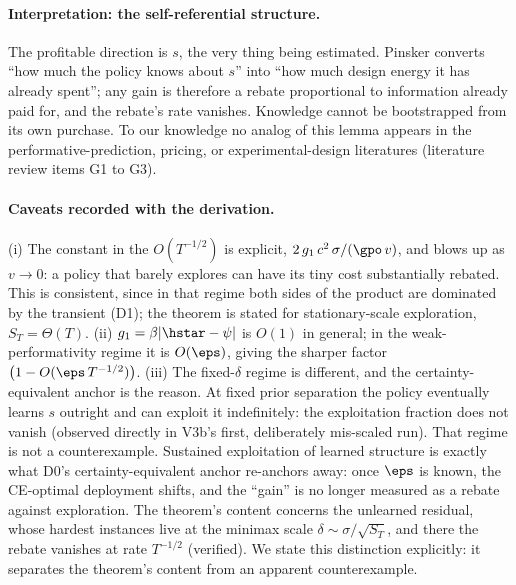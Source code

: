 \paragraph{Interpretation: the self-referential structure.}
The profitable direction is $s$, the very thing being estimated. Pinsker
converts ``how much the policy knows about $s$'' into ``how much design
energy it has already spent''; any gain is therefore a rebate proportional
to information already paid for, and the rebate's rate vanishes. Knowledge
cannot be bootstrapped from its own purchase. To our knowledge no analog of
this lemma appears in the performative-prediction, pricing, or
experimental-design literatures (literature review items G1 to G3).

\paragraph{Caveats recorded with the derivation.}
(i) The constant in the $O(T^{-1/2})$ is explicit,
$2\,g_1\,c^2\,\sigma/(\gpo\, v)$, and blows up as $v\to 0$: a policy that
barely explores can have its tiny cost substantially rebated. This is
consistent, since in that regime both sides of the product are dominated by
the transient (D1); the theorem is stated for stationary-scale exploration,
$S_T=\Theta(T)$.
(ii) $g_1=\beta|\hstar-\psi|$ is $O(1)$ in general; in the
weak-performativity regime it is $O(\eps)$, giving the sharper factor
$\big(1-O(\eps\, T^{-1/2})\big)$.
(iii) The fixed-$\delta$ regime is different, and the certainty-equivalent
anchor is the reason. At fixed prior separation the policy eventually learns
$s$ outright and can exploit it indefinitely: the exploitation fraction does
not vanish (observed directly in V3b's first, deliberately mis-scaled run).
That regime is not a counterexample. Sustained exploitation of learned
structure is exactly what D0's certainty-equivalent anchor re-anchors away:
once $\eps$ is known, the CE-optimal deployment shifts, and the ``gain'' is
no longer measured as a rebate against exploration. The theorem's content
concerns the unlearned residual, whose hardest instances live at the minimax
scale $\delta\sim\sigma/\sqrt{S_T}$, and there the rebate vanishes at rate
$T^{-1/2}$ (verified). We state this distinction explicitly: it separates
the theorem's content from an apparent counterexample.

